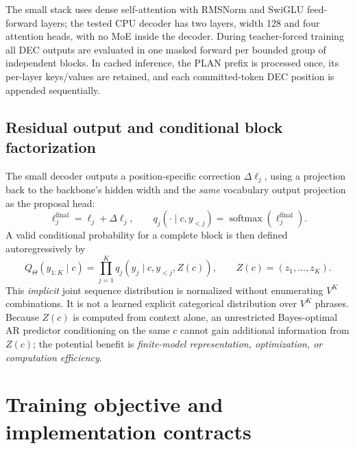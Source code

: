 \documentclass[11pt,letterpaper]{article}
\newcommand{\softmax}{\operatorname{softmax}}
\begin{document}
The small stack uses dense self-attention with RMSNorm and SwiGLU feed-forward layers; the tested CPU decoder has two layers, width 128 and four attention heads, with no MoE inside the decoder. During teacher-forced training all DEC outputs are evaluated in one masked forward per bounded group of independent blocks. In cached inference, the PLAN prefix is processed once, its per-layer keys/values are retained, and each committed-token DEC position is appended sequentially.

\subsection{Residual output and conditional block factorization}
The small decoder outputs a position-specific correction $\Delta\ell_j$, using a projection back to the backbone's hidden width and the \emph{same} vocabulary output projection as the proposal head:
\begin{equation}
  \ell_j^{\mathrm{final}}=\ell_j+\Delta\ell_j,\qquad
  q_j(\cdot\mid c,y_{<j})=\softmax(\ell_j^{\mathrm{final}}).
  \label{eq:final}
\end{equation}
A valid conditional probability for a complete block is then defined autoregressively by
\begin{equation}
 Q_\Theta(y_{1:K}\mid c)=\prod_{j=1}^{K}q_j(y_j\mid c,y_{<j},Z(c)),
 \qquad Z(c)=(z_1,\ldots,z_K).
 \label{eq:joint}
\end{equation}
This \emph{implicit} joint sequence distribution is normalized without enumerating $V^K$ combinations. It is not a learned explicit categorical distribution over $V^K$ phrases. Because $Z(c)$ is computed from context alone, an unrestricted Bayes-optimal AR predictor conditioning on the same $c$ cannot gain additional information from $Z(c)$; the potential benefit is \emph{finite-model representation, optimization, or computation efficiency}.

\section{Training objective and implementation contracts}
\end{document}
